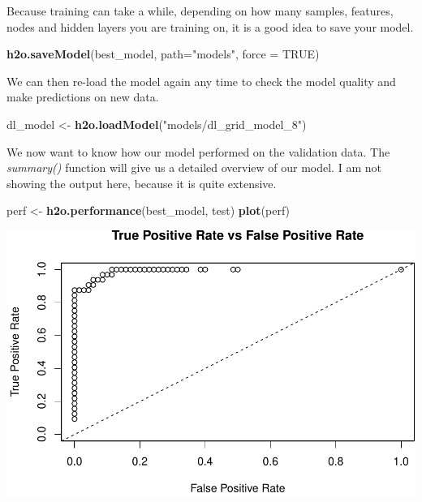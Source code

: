 \documentclass[]{article}
\newenvironment{Shaded}{\begin{snugshade}}{\end{snugshade}}
\newcommand{\KeywordTok}[1]{\textcolor[rgb]{0.13,0.29,0.53}{\textbf{{#1}}}}
\newcommand{\DataTypeTok}[1]{\textcolor[rgb]{0.13,0.29,0.53}{{#1}}}
\newcommand{\StringTok}[1]{\textcolor[rgb]{0.31,0.60,0.02}{{#1}}}
\newcommand{\OtherTok}[1]{\textcolor[rgb]{0.56,0.35,0.01}{{#1}}}
\newcommand{\NormalTok}[1]{{#1}}
\begin{document}
Because training can take a while, depending on how many samples,
features, nodes and hidden layers you are training on, it is a good idea
to save your model.

\begin{Shaded}
\begin{Highlighting}[]
\KeywordTok{h2o.saveModel}\NormalTok{(best_model, }\DataTypeTok{path=}\StringTok{"models"}\NormalTok{, }\DataTypeTok{force =} \OtherTok{TRUE}\NormalTok{)}
\end{Highlighting}
\end{Shaded}

We can then re-load the model again any time to check the model quality
and make predictions on new data.

\begin{Shaded}
\begin{Highlighting}[]
\NormalTok{dl_model <-}\StringTok{ }\KeywordTok{h2o.loadModel}\NormalTok{(}\StringTok{"models/dl_grid_model_8"}\NormalTok{)}
\end{Highlighting}
\end{Shaded}

We now want to know how our model performed on the validation data. The
\emph{summary()} function will give us a detailed overview of our model.
I am not showing the output here, because it is quite extensive.

\begin{Shaded}
\begin{Highlighting}[]
\NormalTok{perf <-}\StringTok{ }\KeywordTok{h2o.performance}\NormalTok{(best_model, test)}
\KeywordTok{plot}\NormalTok{(perf)}
\end{Highlighting}
\end{Shaded}

\includegraphics{webinar_code_files/figure-latex/unnamed-chunk-58-1.pdf}
\end{document}
